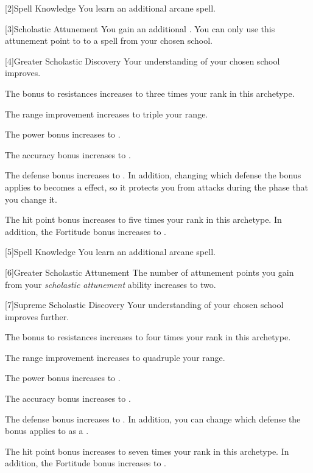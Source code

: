         [2]{Spell Knowledge} You learn an additional arcane spell.

        [3]{Scholastic Attunement} You gain an additional .
        You can only use this attunement point to  to a spell from your chosen school.

        [4]{Greater Scholastic Discovery} Your understanding of your chosen school improves.
        {
             The bonus to resistances increases to three times your rank in this archetype.

             The range improvement increases to triple your range.

             The power bonus increases to .

             The accuracy bonus increases to .

             The defense bonus increases to .
            In addition, changing which defense the bonus applies to becomes a  effect, so it protects you from attacks during the phase that you change it.

             The hit point bonus increases to five times your rank in this archetype.
            In addition, the Fortitude bonus increases to .
        }

        [5]{Spell Knowledge} You learn an additional arcane spell.

        [6]{Greater Scholastic Attunement} The number of attunement points you gain from your \textit{scholastic attunement} ability increases to two.

        [7]{Supreme Scholastic Discovery} Your understanding of your chosen school improves further.
        {
             The bonus to resistances increases to four times your rank in this archetype.

             The range improvement increases to quadruple your range.

             The power bonus increases to .

             The accuracy bonus increases to .

             The defense bonus increases to .
            In addition, you can change which defense the bonus applies to as a .

             The hit point bonus increases to seven times your rank in this archetype.
            In addition, the Fortitude bonus increases to .
        }
